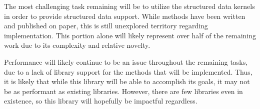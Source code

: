 \documentclass{sig-alternate}
\begin{document}
The most challenging task remaining will be to utilize the structured data kernels in order to
provide structured data support. While methods have been written and published on paper,
this is still unexplored territory regarding implementation. This portion alone will likely 
represent over half of the remaining work due to its complexity and relative novelty. 

Performance will likely continue to be an issue throughout the remaining tasks, due to a lack
of library support for the methods that will be implemented. Thus, it is likely that while 
this library will be able to accomplish its goals, it may not be as performant as existing 
libraries. However, there are few libraries even in existence, so this library will hopefully
be impactful regardless. 

\vspace{175pt}
\end{document}
